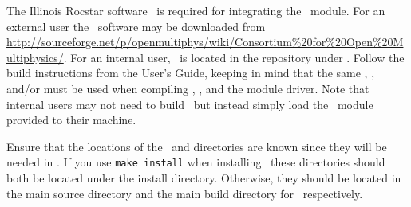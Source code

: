 
The Illinois Rocstar software \IMPACT\, is required for integrating the \icofoam\, module. For an external user the \IMPACT\, software may be downloaded from \url{http://sourceforge.net/p/openmultiphys/wiki/Consortium\%20for\%20Open\%20Multiphysics/}. For an internal user, \impact\, is located in the repository under . Follow the build instructions from the User's Guide, keeping in mind that the same , , and/or  must be used when compiling , \openfoam, and the module driver. Note that internal users may not need to build \impact\, but instead simply load the \impact\, module provided to their machine. 

Ensure that the locations of the \impact\,  and  directories are known since they will be needed in . If you use \texttt{make install} when installing \impact\, these directories should both be located under the install directory. Otherwise, they should be located in the main source directory and the main build directory for \impact\, respectively.